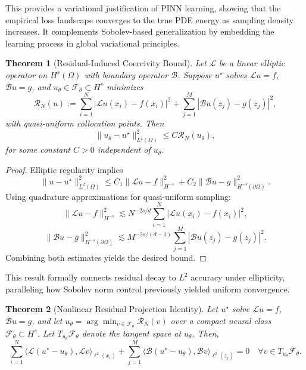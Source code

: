 \documentclass[11pt, a4paper]{article}
\newtheorem{thm}{Theorem}
\begin{document}
\vspace{1em}
This provides a variational justification of PINN learning, showing that the empirical loss landscape converges to the true PDE energy as sampling density increases. It complements Sobolev-based generalization by embedding the learning process in global variational principles.

\begin{thm}[Residual-Induced Coercivity Bound]
\label{thm:coercivity}
Let $\mathcal{L}$ be a linear elliptic operator on $H^s(\Omega)$ with boundary operator $\mathcal{B}$. Suppose $u^\star$ solves $\mathcal{L} u = f$, $\mathcal{B} u = g$, and $u_\theta \in \mathcal{F}_\theta \subset H^s$ minimizes
\[
\mathcal{R}_N(u) := \sum_{i=1}^N |\mathcal{L}u(x_i) - f(x_i)|^2 + \sum_{j=1}^M |\mathcal{B}u(z_j) - g(z_j)|^2,
\]
with quasi-uniform collocation points. Then
\[
\| u_\theta - u^\star \|_{L^2(\Omega)}^2 \leq C \mathcal{R}_N(u_\theta),
\]
for some constant $C > 0$ independent of $u_\theta$.
\end{thm}

\begin{proof}
Elliptic regularity implies
\[
\| u - u^\star \|_{L^2(\Omega)}^2 \leq C_1 \| \mathcal{L} u - f \|_{H^{-s}}^2 + C_2 \| \mathcal{B} u - g \|_{H^{-s}(\partial\Omega)}^2.
\]
Using quadrature approximations for quasi-uniform sampling:
\[
\| \mathcal{L} u - f \|_{H^{-s}}^2 \lesssim N^{-2s/d} \sum_{i=1}^N |\mathcal{L}u(x_i) - f(x_i)|^2,
\]
\[
\| \mathcal{B} u - g \|_{H^{-s}(\partial\Omega)}^2 \lesssim M^{-2s/(d-1)} \sum_{j=1}^M |\mathcal{B}u(z_j) - g(z_j)|^2.
\]
Combining both estimates yields the desired bound.
\end{proof}

\vspace{1em}
This result formally connects residual decay to $L^2$ accuracy under ellipticity, paralleling how Sobolev norm control previously yielded uniform convergence.

\begin{thm}[Nonlinear Residual Projection Identity]
\label{thm:nonlinear_projection}
Let $u^\star$ solve $\mathcal{L} u = f$, $\mathcal{B} u = g$, and let $u_\theta = \arg\min_{v \in \mathcal{F}_\theta} \mathcal{R}_N(v)$ over a compact neural class $\mathcal{F}_\theta \subset H^s$. Let $T_{u_\theta} \mathcal{F}_\theta$ denote the tangent space at $u_\theta$. Then,
\[
\sum_{i=1}^N \langle \mathcal{L}(u^\star - u_\theta), \mathcal{L}v \rangle_{\ell^2(x_i)} + \sum_{j=1}^M \langle \mathcal{B}(u^\star - u_\theta), \mathcal{B}v \rangle_{\ell^2(z_j)} = 0 \quad \forall v \in T_{u_\theta} \mathcal{F}_\theta.
\]
\end{thm}
\end{document}
